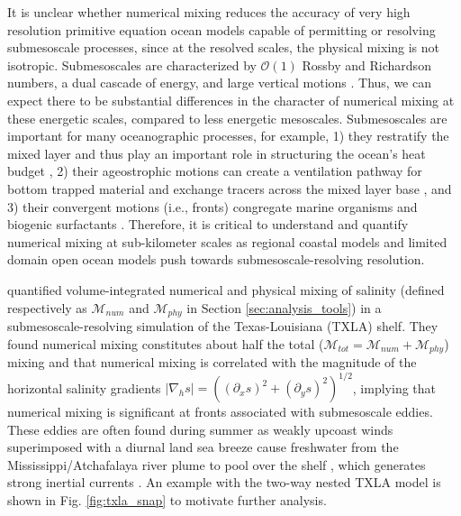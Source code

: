 It is unclear whether numerical mixing reduces the accuracy of very high resolution primitive equation ocean models capable of permitting or resolving submesoscale processes, since at the resolved scales, the physical mixing is not isotropic. Submesoscales are characterized by $\mathcal{O}(1)$ Rossby and Richardson numbers, a dual cascade of energy, and large vertical motions \citep{McWilliams_2016, taylor2023submesoscale}. Thus, we can expect there to be substantial differences in the character of numerical mixing at these energetic scales, compared to less energetic mesoscales. Submesoscales are important for many oceanographic processes, for example, 1) they restratify the mixed layer and thus play an important role in structuring the ocean's heat budget \citep{boccaletti2007mixed, su2018ocean}, 2) their ageostrophic motions can create a ventilation pathway for bottom trapped material \citep{qu2022rapid} and exchange tracers across the mixed layer base \citep{balwada2021vertical}, and 3) their convergent motions (i.e., fronts) congregate marine organisms and biogenic surfactants \citep{mcwilliams2019survey, ruiz2019effects}. Therefore, it is critical to understand and quantify numerical mixing at sub-kilometer scales as regional coastal models and limited domain open ocean models push towards submesoscale-resolving resolution.

\citet{Schlichting23} quantified volume-integrated numerical and physical mixing of salinity (defined respectively as $\mathcal{M}_{num}$ and $\mathcal{M}_{phy}$ in Section \ref{sec:analysis_tools}) in a submesoscale-resolving simulation of the Texas-Louisiana (TXLA) shelf. They found numerical mixing constitutes about half the total ($\mathcal{M}_{tot} = \mathcal{M}_{num} + \mathcal{M}_{phy}$) mixing and that numerical mixing is correlated with the magnitude of the horizontal salinity gradients $|\nabla_h s| = \left((\partial_x s)^2 + (\partial_y s)^2 \right)^{1/2}$, implying that numerical mixing is significant at fronts associated with submesoscale eddies. These eddies are often found during summer as weakly upcoast winds superimposed with a diurnal land sea breeze cause freshwater from the Mississippi/Atchafalaya river plume to pool over the shelf \citep{Hetland_2017}, which generates strong inertial currents \citep{Kobashi_2020, qu2022rapid}. An example with the two-way nested TXLA model is shown in Fig. \ref{fig:txla_snap} to motivate further analysis.

